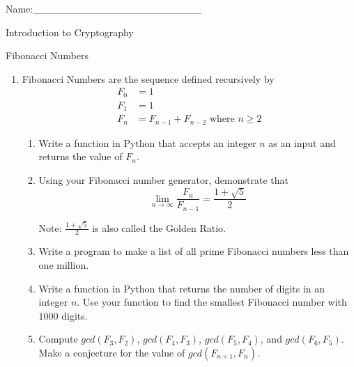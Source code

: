 \documentclass[12pt]{amsart}
\theoremstyle{definition}
\theoremstyle{remark}
\numberwithin{equation}{section}
\begin{document}
\begin{flushright}
Name:\_\_\_\_\_\_\_\_\_\_\_\_\_\_\_\_\_\_\_\_\_\_\_
\end{flushright}
\vspace{10pt}
\begin{center}
Introduction to Cryptography

Fibonacci Numbers
\end{center}


\begin{enumerate}
\item Fibonacci Numbers are the sequence defined recursively by 
\begin{align*}
F_0&=1\\
F_1&=1\\
F_n&=F_{n-1}+F_{n-2} \text{ where } n\geq2
\end{align*}
\begin{enumerate}
\item Write a function in Python that accepts an integer $n$ as an input and returns the value of $F_n$.
\item Using your Fibonacci number generator, demonstrate that $$\lim_{n\rightarrow\infty} \frac{F_n}{F_{n-1}}=\frac{1+\sqrt{5}}{2}$$

Note: $\frac{1+\sqrt{5}}{2}$ is also called the Golden Ratio.
\item Write a program to make a list of all prime Fibonacci numbers less than one million.
\item Write a function in Python that returns the number of digits in an integer $n$. Use your function to find the smallest Fibonacci number with $1000$ digits.
\item Compute $gcd(F_3,F_2)$, $gcd(F_4,F_3)$, $gcd(F_5, F_4)$, and $gcd(F_6,F_5)$. Make a conjecture for the value of $gcd(F_{n+1},F_n)$.
\end{enumerate}

\end{enumerate}
\vfill
\end{document}
